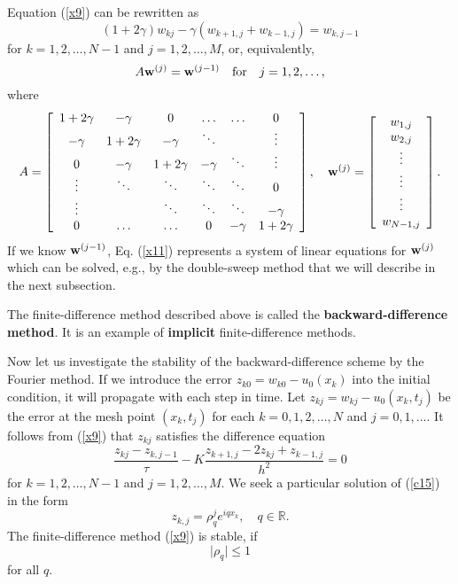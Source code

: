 Equation (\ref{x9}) can be rewritten as
\begin{equation}
(1+2\gamma)w_{kj}-\gamma (w_{k+1, j}+w_{k-1, j})=w_{k,j-1} \label{x10}
\end{equation}
for $k=1, 2, \dots, N-1$ and $j=1, 2, \dots,M$, or, equivalently,
\begin{equation}
A{\bf w}^{(j)}={\bf w}^{(j-1)} \quad \hbox{for} \quad j=1,2,\dots, \label{x11}
\end{equation}
where
\begin{equation}
A=\left[
\begin{array}{cccccc}
1+2\gamma &-\gamma &0      &\dots  &\dots &0 \\
-\gamma &1+2\gamma &-\gamma &\ddots  &     &\vdots \\
0      &-\gamma &1+2\gamma &-\gamma &\ddots &\vdots \\
\vdots &\ddots &\ddots &\ddots &\ddots &0 \\
\vdots &       &\ddots &\ddots &\ddots &-\gamma \\
0      &\dots  &\dots  &0      &-\gamma &1+2\gamma
\end{array}\right], \quad
{\bf w}^{(j)}=\left[
\begin{array}{c}
w_{1,j} \\
w_{2,j} \\
\vdots \\
\vdots \\
\vdots \\
w_{N-1,j}
\end{array}\right].
\label{x12}
\end{equation}
If we know ${\bf w}^{(j-1)}$, Eq. (\ref{x11}) represents a system of linear equations for
${\bf w}^{(j)}$ which can be solved, e.g., by the double-sweep method that we will describe in 
the next subsection.

The finite-difference method described above is called the {\bf backward-difference method}. It is an example
of {\bf implicit} finite-difference methods.

 
 
Now let us investigate the stability of the backward-difference scheme
by the Fourier method.
If we introduce the error $z_{k0}=w_{k0}-u_{0}(x_{k})$ into the initial condition, it
will propagate with each step in time. Let $z_{kj}=w_{kj}-u_{0}(x_{k},t_{j})$ be
the error at the mesh point $(x_{k}, t_{j})$ for each $k=0,1,2, \dots, N$
and $j=0,1, \dots$.
It follows from (\ref{x9}) that $z_{kj}$ satisfies the difference equation
\begin{equation}
\frac{z_{kj}-z_{k,j-1}}{\tau}-K
\frac{z_{k+1, j}-2z_{kj}+z_{k-1,j}}{h^{2}}=0  \label{c15}
\end{equation}
for $k=1, 2, \dots, N-1$ and $j=1, 2, \dots, M$.
We seek a particular solution of
(\ref{c15}) in the form
\begin{equation}
z_{k,j}=\rho_{q}^{j}e^{iqx_{k}}, \quad q\in{\mathbb R}. \label{c16}
\end{equation}
The finite-difference method (\ref{x9}) is stable, if
\[
\vert\rho_{q}\vert\leq 1
\]
for all $q$.

